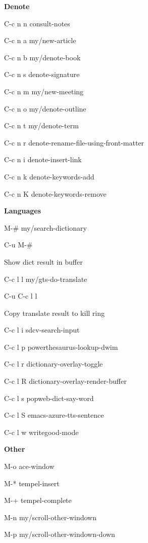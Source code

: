 \documentclass[10pt]{article}
\renewcommand\subsection[1]{\smallskip\par\textbf{\color{heading}#1}}
\newcommand\humanreadable[1]{{\par\color{default}\small\sffamily#1}}
\begin{document}
\begin{multicols}{4}
  \subsection{Denote}
  \begin{keylist}
    \item[C-c n n] consult-notes
    \item[C-c n a] my/new-article
    \item[C-c n b] my/denote-book
    \item[C-c n s] denote-signature
    \item[C-c n m] my/new-meeting
    \item[C-c n o] my/denote-outline
    \item[C-c n t] my/denote-term
    \item[C-c n r] denote-rename-file-using-front-matter
    \item[C-c n i] denote-insert-link
    \item[C-c n k] denote-keywords-add
    \item[C-c n K] denote-keywords-remove
  \end{keylist}

  \subsection{Languages}
  \begin{keylist}
    \item[M-\#] my/search-dictionary
    \item[C-u M-\#] \humanreadable{Show dict result in buffer}
    \item[C-c l l] my/gts-do-translate
    \item[C-u C-c l l] \humanreadable{Copy translate result to kill ring}
    \item[C-c l i] sdcv-search-input
    \item[C-c l p] powerthesaurus-lookup-dwim
    \item[C-c l r] dictionary-overlay-toggle
    \item[C-c l R] dictionary-overlay-render-buffer
    \item[C-c l s] popweb-dict-say-word
    \item[C-c l S] emacs-azure-tts-sentence
    \item[C-c l w] writegood-mode
  \end{keylist}

  \subsection{Other}
  \begin{keylist}
    \item[M-o] ace-window
    \item[M-*] tempel-insert
    \item[M-+] tempel-complete
    \item[M-n] my/scroll-other-windown
    \item[M-p] my/scroll-other-windown-down


\end{keylist}
\end{multicols}
\end{document}

